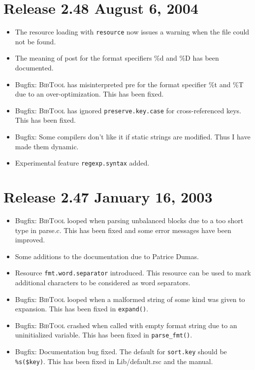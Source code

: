 \documentclass[11pt,a4paper]{scrartcl}
\newcommand\rsc[1]{\texttt{#1}}
\newcommand\File[1]{\textsf{#1}}
\newcommand\BibTool{\textsc{BibTool}}
\newenvironment{Release}[2]{%
  \def\tmp{#2}%
  \section*{Release #1 \ifx\tmp\empty\else{\normalsize[#2]}\fi}
  \begin{itemize}
}{\end{itemize}}
\newenvironment{Fix}[1]{\item }{}
\newenvironment{New}[1]{\item }{}
\newenvironment{Doc}[1]{\item }{}
\begin{document}
\begin{multicols}
\begin{Release}{2.48}{August 6, 2004}
\begin{New}{gene}
    The resource loading with \rsc{resource} now issues a warning when
    the file could not be found.
  \end{New}
  \begin{Doc}{gene}
    The meaning of post for the format specifiers \%d and \%D has been
    documented.
  \end{Doc}
  \begin{Fix}{gene}
    Bugfix: \BibTool{} has misinterpreted pre for the format specifier
    \%t and \%T due to an over-optimization. This has been fixed.
  \end{Fix}
  \begin{Fix}{gene}
    Bugfix: \BibTool{} has ignored \rsc{preserve.key.case} for
    cross-referenced keys. This has been fixed.
  \end{Fix}
  \begin{Fix}{gene}
    Bugfix: Some compilers don't like it if static strings are
    modified. Thus I have made them dynamic.
  \end{Fix}
  \begin{New}{gene}
    Experimental feature \rsc{regexp.syntax} added.
  \end{New}
 \end{Release}

 \begin{Release}{2.47}{January 16, 2003}
  \begin{Fix}{gene}
    Bugfix: \BibTool{} looped when parsing unbalanced blocks due to a
    too short type in \File{parse.c}. This has been fixed and some
    error messages have been improved.
  \end{Fix}
  \begin{Doc}{gene}
    Some additions to the documentation due to Patrice Dumas.
  \end{Doc}
  \begin{New}{gene}
    Resource \rsc{fmt.word.separator} introduced. This resource can be
    used to mark additional characters to be considered as word
    separators.
  \end{New}
  \begin{Fix}{gene}
    Bugfix: \BibTool{} looped when a malformed string of some kind was
    given to expansion. This has been fixed in \verb|expand()|.
  \end{Fix}
  \begin{Fix}{gene}
    Bugfix: \BibTool{} crashed when called with empty format string
    due to an uninitialized variable. This has been fixed in
    \verb|parse_fmt()|.
  \end{Fix}
  \begin{Doc}{gene}
    Bugfix: Documentation bug fixed. The default for \rsc{sort.key}
    should be \verb|%s($key)|. This has been fixed in
    \File{Lib/default.rsc} and the manual.
  \end{Doc}
 \end{Release}


\end{multicols}
\end{document}
